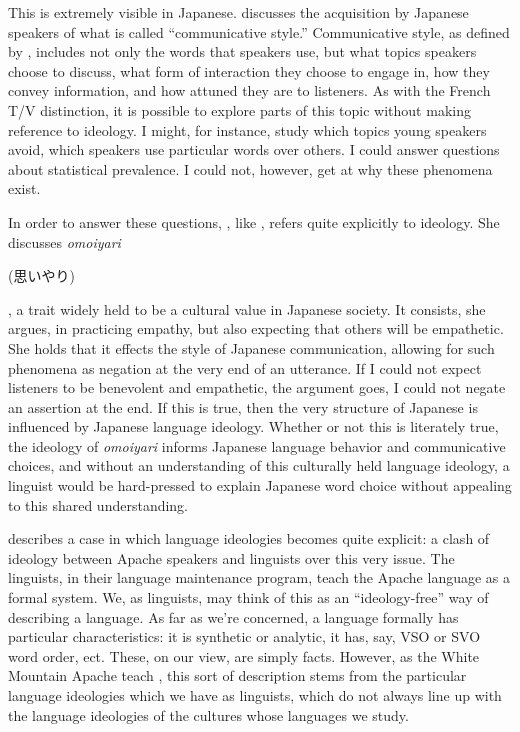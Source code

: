 \documentclass[man,12pt,natbib]{apa6}
\begin{document}
This is extremely visible in Japanese. \citet{Clancy87} discusses the
acquisition by Japanese speakers of what is called ``communicative style.''
Communicative style, as defined by \citet{Barlund75}, includes not only the
words that speakers use, but what topics speakers choose to discuss, what form
of interaction they choose to engage in, how they convey information, and how
attuned they are to listeners. As with the French T/V distinction, it is
possible to explore parts of this topic without making reference to ideology.
I might, for instance, study which topics young speakers avoid, which speakers
use particular words over others. I could answer questions about statistical
prevalence. I could not, however, get at why these phenomena exist.

In order to answer these questions, \citet{Clancy87}, like \cite{Barlund75}, 
refers quite explicitly to ideology. She discusses \emph{omoiyari}
\begin{CJK}{UTF8}{min}(思いやり)\end{CJK}, a trait widely held to be a cultural
value in Japanese society. It consists, she argues, in practicing empathy, but
also expecting that others will be empathetic. She holds that it effects the
style of Japanese communication, allowing for such phenomena as negation at the
very end of an utterance. If I could not expect listeners to be benevolent and
empathetic, the argument goes, I could not negate an assertion at the end. If
this is true, then the very structure of Japanese is influenced by Japanese
language ideology.  Whether or not this is literately true, the ideology of
\emph{omoiyari} informs Japanese language behavior and communicative choices,
and without an understanding of this culturally held language ideology, a
linguist would be hard-pressed to explain Japanese word choice without
appealing to this shared understanding.

\citet{Nevins04} describes a case in which language ideologies becomes quite
explicit: a clash of ideology between Apache speakers and linguists over this
very issue. The linguists, in their language maintenance program, teach the
Apache language as a formal system. We, as linguists, may think of this as an
``ideology-free'' way of describing a language. As far as we're concerned, a
language formally has particular characteristics: it is synthetic or analytic,
it has, say, VSO or SVO word order, ect. These, on our view, are simply facts.
However, as the White Mountain Apache teach \citet{Nevins04}, this sort of
description stems from the particular language ideologies which we have as
linguists, which do not always line up with the language ideologies of the
cultures whose languages we study.
\end{document}
